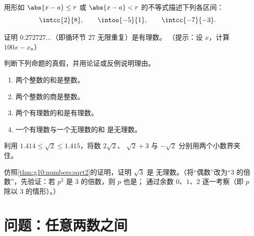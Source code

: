 \begin{exercise}[$\star\star$]\label{exo:g10:numbers:6}
用形如
$\abs{x - a} \leq r$ 或 $\abs{x - a} < r$ 的不等式描述下列各区间：
\[
\intcc{2}{8}, \qquad \intoo{-5}{1}, \qquad \intcc{-7}{-3}.
\]
\end{exercise}

\begin{exercise}[$\star\star$]\label{exo:g10:numbers:7}
证明 $0.272727\dots$（即循环节 $27$ 无限重复）是有理数。
（提示：设 $x$，计算 $100x - x$。）
\end{exercise}

\begin{exercise}[$\star\star$]\label{exo:g10:numbers:8}
判断下列命题的真假，并用论证或反例说明理由。
\begin{enumerate}
  \item 两个整数的和是整数。
  \item 两个整数的商是整数。
  \item 两个有理数的和是有理数。
  \item 一个有理数与一个无理数的和
        是无理数。
\end{enumerate}
\end{exercise}

\begin{exercise}[$\star\star$]\label{exo:g10:numbers:9}
利用 $1.414 \leq \sqrt 2 \leq 1.415$，将数 $2\sqrt2$、
$\sqrt2 + 3$ 与 $-\sqrt2$ 分别用两个小数界夹住。
\end{exercise}

\begin{exercise}[$\star\star\star$]\label{exo:g10:numbers:10}
仿照\cref{thm:g10:numbers:sqrt2}的证明，证明 $\sqrt 3$ 是
无理数。（将“偶数”改为“$3$ 的倍数”，先验证：若
$p^2$ 是 $3$ 的倍数，则 $p$ 也是；
通过余数 $0$、$1$、$2$ 逐一考察（即 $p$ 除以 $3$ 的情形）。）
\end{exercise}

\section{问题：任意两数之间}

